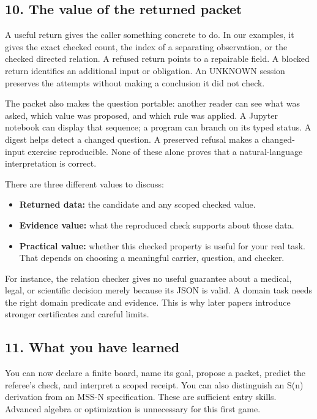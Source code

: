 \documentclass[
  11pt,
]{article}
\providecommand{\tightlist}{%
  \setlength{\itemsep}{0pt}\setlength{\parskip}{0pt}}
\begin{document}
\subsection{10. The value of the returned
packet}\label{the-value-of-the-returned-packet}

A useful return gives the caller something concrete to do. In our
examples, it gives the exact checked count, the index of a separating
observation, or the checked directed relation. A refused return points
to a repairable field. A blocked return identifies an additional input
or obligation. An UNKNOWN session preserves the attempts without making
a conclusion it did not check.

The packet also makes the question portable: another reader can see what
was asked, which value was proposed, and which rule was applied. A
Jupyter notebook can display that sequence; a program can branch on its
typed status. A digest helps detect a changed question. A preserved
refusal makes a changed-input exercise reproducible. None of these alone
proves that a natural-language interpretation is correct.

There are three different values to discuss:

\begin{itemize}
\tightlist
\item
  \textbf{Returned data:} the candidate and any scoped checked value.
\item
  \textbf{Evidence value:} what the reproduced check supports about
  those data.
\item
  \textbf{Practical value:} whether this checked property is useful for
  your real task. That depends on choosing a meaningful carrier,
  question, and checker.
\end{itemize}

For instance, the relation checker gives no useful guarantee about a
medical, legal, or scientific decision merely because its JSON is valid.
A domain task needs the right domain predicate and evidence. This is why
later papers introduce stronger certificates and careful limits.

\subsection{11. What you have learned}\label{what-you-have-learned}

You can now declare a finite board, name its goal, propose a packet,
predict the referee's check, and interpret a scoped receipt. You can
also distinguish an S(n) derivation from an MSS-N specification. These
are sufficient entry skills. Advanced algebra or optimization is
unnecessary for this first game.
\end{document}
